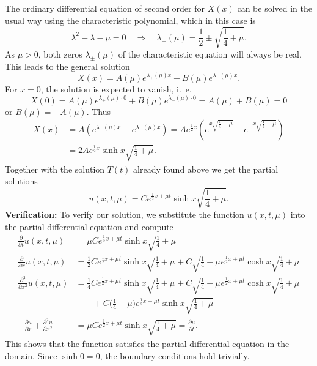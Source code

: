 \begin{loesung}
\begin{teilaufgaben}
The ordinary differential equation of second order for $X(x)$ can
be solved in the usual way using the characteristic polynomial,
which in this case is
\[
\lambda^2-\lambda-\mu=0
\quad
\Rightarrow
\quad
\lambda_{\pm}(\mu)=\frac12\pm\sqrt{\frac14+\mu}.
\]
As $\mu>0$, both zeros $\lambda_{\pm}(\mu)$ of the characteristic
equation will always be real.
This leads to the general solution
\[
X(x)=
A(\mu)e^{\lambda_+(\mu)x}
+
B(\mu)e^{\lambda_-(\mu)x}.
\]
For $x=0$, the solution is expected to vanish, i.~e.
\[
X(0)=
A(\mu)e^{\lambda_+(\mu)\cdot 0}
+
B(\mu)e^{\lambda_-(\mu)\cdot 0}
=A(\mu)+B(\mu)=0
\]
or $B(\mu)=-A(\mu)$.
Thus
\begin{align*}
X(x)&=A(e^{\lambda_+(\mu)x}-e^{\lambda_-(\mu)x})
=Ae^{\frac12x}\left(
e^{x\sqrt{\frac14+\mu}}
-
e^{-x\sqrt{\frac14+\mu}}
\right)
\\
&=2Ae^{\frac12x}\sinh x\sqrt{\frac14+\mu}.
\end{align*}
Together with the solution $T(t)$ already found above we get the
partial solutions
\[
u(x,t,\mu)=
Ce^{\frac12x+\mu t}\sinh x\sqrt{\frac14+\mu}.
\]
{\bf Verification:}
To verify our solution, we substitute the function $u(x,t,\mu)$
into the partial differential equation and compute
\begin{align*}
\frac{\partial}{\partial t}u(x,t,\mu)&=
\mu Ce^{\frac12x+\mu t}\sinh x\sqrt{\frac14+\mu}
\\
\frac{\partial}{\partial x}u(x,t,\mu)&=
\frac12
Ce^{\frac12x+\mu t}\sinh x\sqrt{\frac14+\mu}
+
C\sqrt{\frac14+\mu}e^{\frac12x+\mu t}\cosh x\sqrt{\frac14+\mu}
\\
\frac{\partial^2}{\partial x^2}u(x,t,\mu)&=
\frac14
Ce^{\frac12x+\mu t}\sinh x\sqrt{\frac14+\mu}
+
C\sqrt{\frac14+\mu}e^{\frac12x+\mu t}\cosh x\sqrt{\frac14+\mu}
\\
&\qquad +
C\biggl(\frac14+\mu\biggr)e^{\frac12x+\mu t}\sinh x\sqrt{\frac14+\mu}
\\
-\frac{\partial u}{\partial x}
+
\frac{\partial^2 u}{\partial x^2}
&=
\mu Ce^{\frac12x+\mu t}\sinh x\sqrt{\frac14+\mu}
=
\frac{\partial u}{\partial t}.
\end{align*}
This shows that the function satisfies the partial differential
equation in the domain.
Since $\sinh 0=0$, the boundary conditions hold trivially.
\qedhere
\end{teilaufgaben}
\end{loesung}
